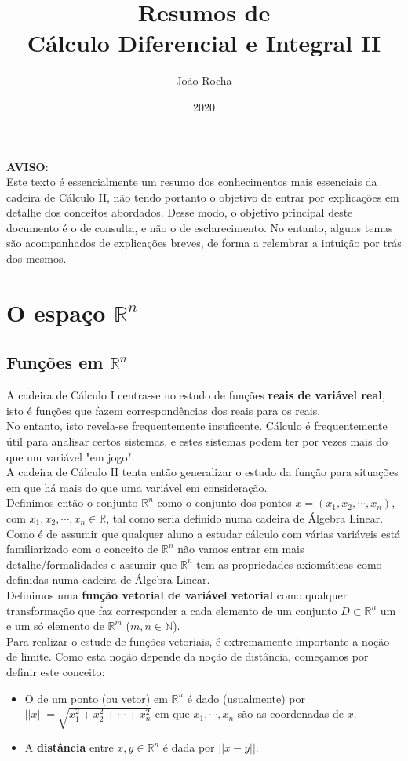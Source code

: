 \documentclass{article}
\title{Resumos de \\ Cálculo Diferencial e Integral II}
\date{2020}
\author{João Rocha}
\newcommand{\R}{\mathbb{R}}
\begin{document}
\maketitle

\vspace*{\fill}
\textbf{AVISO}:\\ 
Este texto é essencialmente um resumo dos conhecimentos mais essenciais da cadeira de Cálculo II, não tendo portanto o objetivo de entrar por explicações em detalhe dos conceitos abordados. Desse modo, o objetivo principal deste documento é o de consulta, e não o de esclarecimento. No entanto, alguns temas são acompanhados de explicações breves, de forma a relembrar a intuição por trás dos mesmos. 
\newpage

\section{O espaço $\R^n$}
\subsection{Funções em $\R^n$}
A cadeira de Cálculo I centra-se no estudo de funções \textbf{reais de variável real}, isto é funções que fazem correspondências dos reais para os reais.\\
No entanto, isto revela-se frequentemente insuficente. Cálculo é frequentemente útil para analisar certos sistemas, e estes sistemas podem ter por vezes mais do que um variável "em jogo".\\
A cadeira de Cálculo II tenta então generalizar o estudo da função para situações em que há mais do que uma variável em consideração.\\
Definimos então o conjunto $\R^n$ como o conjunto dos pontos $x=(x_1, x_2, \cdots, x_n)$, com $x_1, x_2, \cdots , x_n \in \R$, tal como seria definido numa cadeira de Álgebra Linear. Como é de assumir que qualquer aluno a estudar cálculo com várias variáveis está familiarizado com o conceito de $\R^n$ não vamos entrar em mais detalhe/formalidades e assumir que $\R^n$ tem as propriedades axiomáticas como definidas numa cadeira de Álgebra Linear.\\
Definimos uma \textbf{função vetorial de variável vetorial} como qualquer transformação que faz corresponder a cada elemento de um conjunto $D \subset \R^n$ um e um só elemento de $\R^m$ ($m,n \in \mathbb{N}$).\\
Para realizar o estude de funções vetoriais, é extremamente importante a noção de limite. Como esta noção depende da noção de distância, começamos por definir este conceito:
\begin{itemize}
	\item O  de um ponto (ou vetor) em $\R^n$ é dado (usualmente) por $||x|| = \sqrt{x_1^2 + x_2^2 + \cdots + x_n^2}$ em que $x_1, \cdots , x_n$ são as coordenadas de $x$.
	\item A \textbf{distância} entre $x, y \in \R^n$ é dada por $||x-y||$.
\end{itemize}
\end{document}
